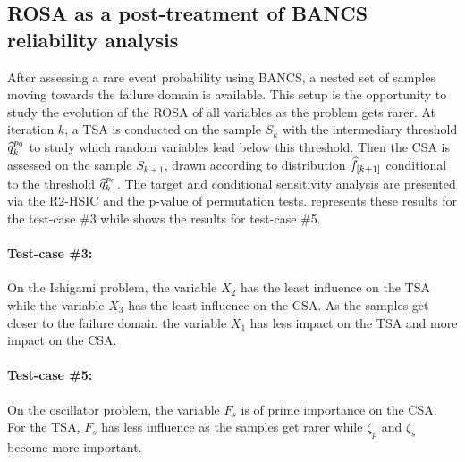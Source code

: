 \subsection{ROSA as a post-treatment of BANCS reliability analysis}

After assessing a rare event probability using BANCS, a nested set of samples moving towards the failure domain is available.
This setup is the opportunity to study the evolution of the ROSA of all variables as the problem gets rarer.
At iteration $k$, a TSA is conducted on the sample $S_k$ with the intermediary threshold $\widehat{q}^{p_0}_k$ to study which random variables lead below this threshold. 
Then the CSA is assessed on the sample $S_{k+1}$, drawn according to distribution $\widehat{f}_{[k+1]}$ conditional to the threshold $\widehat{q}^{p_0}_k$. 
The target and conditional sensitivity analysis are presented via the R2-HSIC and the p-value of permutation tests.  
 represents these results for the test-case \#3 while  shows the results for test-case \#5. 

\paragraph{Test-case \#3:}
On the Ishigami problem, the variable $X_2$ has the least influence on the TSA while the variable $X_3$ has the least influence on the CSA. 
As the samples get closer to the failure domain the variable $X_1$ has less impact on the TSA and more impact on the CSA. 

\paragraph{Test-case \#5:}
On the oscillator problem, the variable $F_s$ is of prime importance on the CSA. 
For the TSA, $F_s$ has less influence as the samples get rarer while $\zeta_p$ and $\zeta_s$ become more important.  

